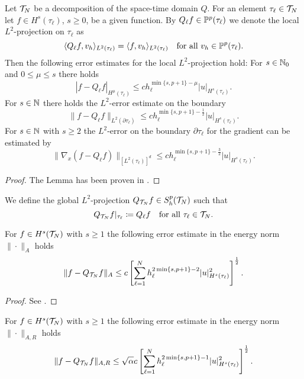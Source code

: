 \documentclass[../thesis.tex]{subfiles}
\begin{document}
\begin{lemma}
\label{thm:L2-approximation-props}
Let $\mathcal{T}_N$ be a decomposition of the space-time domain $Q$.
For an element $\tau_\ell \in \mathcal{T}_N$ let $f \in H^s(\tau_\ell)$, $s \geq 0$, be a given function.
By $Q_\ell f \in \mathbb{P}^p(\tau_\ell)$ we denote the local $L^2$-projection on $\tau_\ell$ as
\[
	\langle Q_\ell f, v_h \rangle_{L^2(\tau_\ell)} = \langle f, v_h \rangle_{L^2(\tau_\ell)} \quad \text{for all } v_h \in \mathbb{P}^p(\tau_\ell).
\]
Then the following error estimates for the local $L^2$-projection hold:
For $s \in \mathbb{N}_0$ and $0 \leq \mu \leq s$ there holds
\[
	| f - Q_\ell f |_{H^\mu(\tau_\ell)} \leq ch_\ell^{\min\{s, p+1\} - \mu} |u|_{H^s(\tau_\ell)}.
\]
For $s \in \mathbb{N}$ there holds the $L^2$-error estimate on the boundary
\[
	\| f - Q_\ell f \|_{L^2(\partial \tau_\ell)} \leq ch_\ell^{\min\{s, p+1\} - \frac{1}{2}} |u|_{H^s(\tau_\ell)}.
\]
For $s \in \mathbb{N}$ with $s \geq 2$ the $L^2$-error on the boundary $\partial \tau_\ell$ for the gradient can be estimated by
\[
	\| \nabla_x (f - Q_\ell f) \|_{[L^2(\tau_\ell)]^d} \leq ch_\ell^{\min\{s, p+1\} - \frac{3}{2}} |u|_{H^s(\tau_\ell)}.
\]
\end{lemma}
\begin{proof}
The Lemma has been proven in \cite{DiPietroErn}.
\end{proof}
We define the global $L^2$-projection $Q_{\mathcal{T}_N} f \in S_h^p(\mathcal{T}_N)$ such that
\[
	Q_{\mathcal{T}_N} f|_{\tau_\ell} \coloneqq Q_\ell f \quad \text{for all } \tau_\ell \in \mathcal{T}_N.
\]
\begin{lemma}
For $f \in H^s(\mathcal{T}_N)$ with $s \geq 1$ the following error estimate in the energy norm $\| \cdot \|_A$ holds
\[
	\| f - Q_{\mathcal{T}_N} f \|_A \leq c \left[ \sum_{\ell=1}^N h_\ell^{2 \min \{ s, p+ 1 \} -2 } |u|^2_{H^s(\tau_\ell)} \right]^\frac{1}{2}.
\]
\end{lemma}
\begin{proof}
See \cite[Lemma 2.2.24]{Neumueller}.
\end{proof}
\begin{lemma}
For $f \in H^s(\mathcal{T}_N)$ with $s \geq 1$ the following error estimate in the energy norm $\| \cdot \|_{A,R}$ holds
\[
	\| f - Q_{\mathcal{T}_N} f \|_{A,R} \leq \sqrt{\alpha} c \left[ \sum_{\ell=1}^N h_\ell^{2 \min \{ s, p+ 1 \} - 1} |u|^2_{H^s(\tau_\ell)} \right]^\frac{1}{2}.
\]
\end{lemma}
\end{document}
